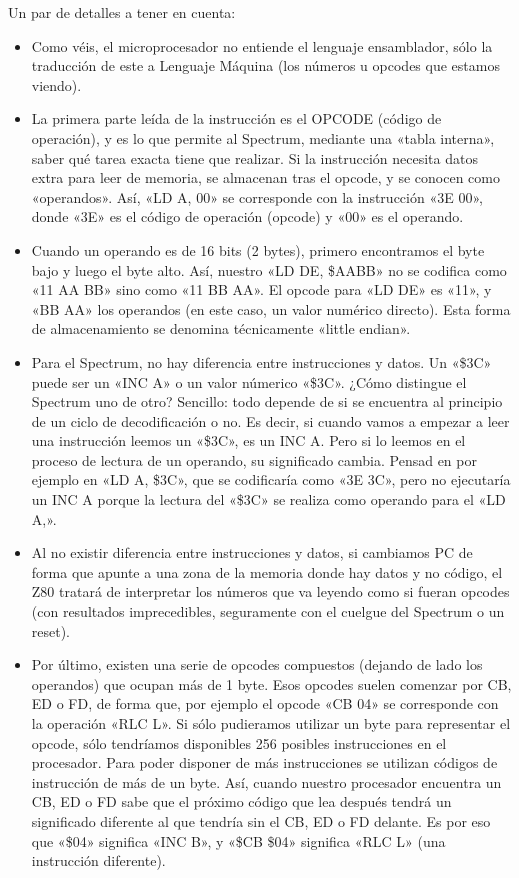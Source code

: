 \documentclass[letterpaper,10pt,spanish]{sphinxmanual}
\begin{document}
Un par de detalles a tener en cuenta:
\begin{itemize}
\item {} 
Como véis, el microprocesador no entiende el lenguaje ensamblador, sólo la traducción de este a Lenguaje Máquina (los números u opcodes que estamos viendo).

\item {} 
La primera parte leída de la instrucción es el OPCODE (código de operación), y es lo que permite al Spectrum, mediante una «tabla interna», saber qué tarea exacta tiene que realizar. Si la instrucción necesita datos extra para leer de memoria, se almacenan tras el opcode, y se conocen como «operandos». Así, «LD A, 00» se corresponde con la instrucción «3E 00», donde «3E» es el código de operación (opcode) y «00» es el operando.

\item {} 
Cuando un operando es de 16 bits (2 bytes), primero encontramos el byte bajo y luego el byte alto. Así, nuestro «LD DE, \$AABB» no se codifica como «11 AA BB» sino como «11 BB AA». El opcode para «LD DE» es «11», y «BB AA» los operandos (en este caso, un valor numérico directo). Esta forma de almacenamiento se denomina técnicamente «little endian».

\item {} 
Para el Spectrum, no hay diferencia entre instrucciones y datos. Un «\$3C» puede ser un «INC A» o un valor númerico «\$3C». ¿Cómo distingue el Spectrum uno de otro? Sencillo: todo depende de si se encuentra al principio de un ciclo de decodificación o no. Es decir, si cuando vamos a empezar a leer una instrucción leemos un «\$3C», es un INC A. Pero si lo leemos en el proceso de lectura de un operando, su significado cambia. Pensad en por ejemplo en «LD A, \$3C», que se codificaría como «3E 3C», pero no ejecutaría un INC A porque la lectura del «\$3C» se realiza como operando para el «LD A,».

\item {} 
Al no existir diferencia entre instrucciones y datos, si cambiamos PC de forma que apunte a una zona de la memoria donde hay datos y no código, el Z80 tratará de interpretar los números que va leyendo como si fueran opcodes (con resultados imprecedibles, seguramente con el cuelgue del Spectrum o un reset).

\item {} 
Por último, existen una serie de opcodes compuestos (dejando de lado los operandos) que ocupan más de 1 byte. Esos opcodes suelen comenzar por CB, ED o FD, de forma que, por ejemplo el opcode «CB 04» se corresponde con la operación «RLC L». Si sólo pudieramos utilizar un byte para representar el opcode, sólo tendríamos disponibles 256 posibles instrucciones en el procesador. Para poder disponer de más instrucciones se utilizan códigos de instrucción de más de un byte. Así, cuando nuestro procesador encuentra un CB, ED o FD sabe que el próximo código que lea después tendrá un significado diferente al que tendría sin el CB, ED o FD delante. Es por eso que «\$04» significa «INC B», y «\$CB \$04» significa «RLC L» (una instrucción diferente).

\end{itemize}
\end{document}
